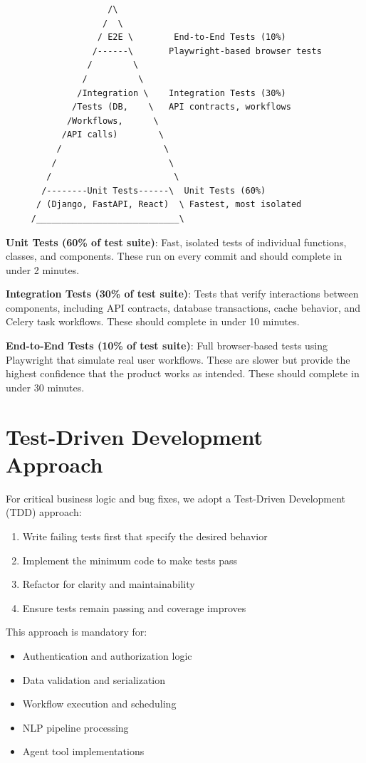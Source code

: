\documentclass{report}
\begin{document}
\begin{verbatim}
                    /\
                   /  \
                  / E2E \        End-to-End Tests (10%)
                 /------\       Playwright-based browser tests
                /        \
               /          \
              /Integration \    Integration Tests (30%)
             /Tests (DB,    \   API contracts, workflows
            /Workflows,      \
           /API calls)        \
          /                    \
         /                      \
        /                        \
       /--------Unit Tests------\  Unit Tests (60%)
      / (Django, FastAPI, React)  \ Fastest, most isolated
     /____________________________\
\end{verbatim}

\textbf{Unit Tests (60\% of test suite)}: Fast, isolated tests of individual functions, classes, and components. These run on every commit and should complete in under 2 minutes.

\textbf{Integration Tests (30\% of test suite)}: Tests that verify interactions between components, including API contracts, database transactions, cache behavior, and Celery task workflows. These should complete in under 10 minutes.

\textbf{End-to-End Tests (10\% of test suite)}: Full browser-based tests using Playwright that simulate real user workflows. These are slower but provide the highest confidence that the product works as intended. These should complete in under 30 minutes.

\section{Test-Driven Development Approach}

For critical business logic and bug fixes, we adopt a Test-Driven Development (TDD) approach:

\begin{enumerate}
  \item Write failing tests first that specify the desired behavior
  \item Implement the minimum code to make tests pass
  \item Refactor for clarity and maintainability
  \item Ensure tests remain passing and coverage improves
\end{enumerate}

This approach is mandatory for:
\begin{itemize}
  \item Authentication and authorization logic
  \item Data validation and serialization
  \item Workflow execution and scheduling
  \item NLP pipeline processing
  \item Agent tool implementations
\end{itemize}
\end{document}
